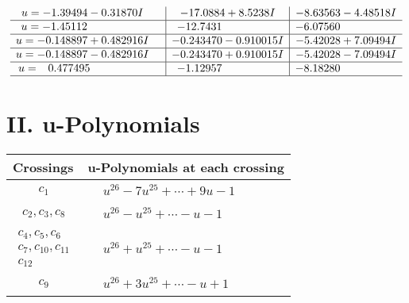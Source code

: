 \documentclass[1p]{elsarticle_modified}
\theoremstyle{definition}
\begin{document}
$$\begin{array}{c|c|c}
\begin{aligned}
u &= -1.39494 - 0.31870 I\end{aligned}
 & -17.0884 + 8.5238 I & -8.63563 - 4.48518 I \\ \hline\begin{aligned}
u &= -1.45112\phantom{ +0.000000I}\end{aligned}
 & -12.7431\phantom{ +0.000000I} & -6.07560\phantom{ +0.000000I} \\ \hline\begin{aligned}
u &= -0.148897 + 0.482916 I\end{aligned}
 & -0.243470 - 0.910015 I & -5.42028 + 7.09494 I \\ \hline\begin{aligned}
u &= -0.148897 - 0.482916 I\end{aligned}
 & -0.243470 + 0.910015 I & -5.42028 - 7.09494 I \\ \hline\begin{aligned}
u &= \phantom{-}0.477495\phantom{ +0.000000I}\end{aligned}
 & -1.12957\phantom{ +0.000000I} & -8.18280\phantom{ +0.000000I}\\
 \hline 
 \end{array}$$\newpage
\newpage\renewcommand{\arraystretch}{1}
\centering \section*{ II. u-Polynomials}
\begin{tabular}{m{50pt}|m{274pt}}
Crossings & \hspace{64pt}u-Polynomials at each crossing \\
\hline $$\begin{aligned}c_{1}\end{aligned}$$&$\begin{aligned}
&u^{26}-7 u^{25}+\cdots+9 u-1
\end{aligned}$\\
\hline $$\begin{aligned}c_{2},c_{3},c_{8}\end{aligned}$$&$\begin{aligned}
&u^{26}- u^{25}+\cdots- u-1
\end{aligned}$\\
\hline $$\begin{aligned}c_{4},c_{5},c_{6}\\c_{7},c_{10},c_{11}\\c_{12}\end{aligned}$$&$\begin{aligned}
&u^{26}+u^{25}+\cdots- u-1
\end{aligned}$\\
\hline $$\begin{aligned}c_{9}\end{aligned}$$&$\begin{aligned}
&u^{26}+3 u^{25}+\cdots- u+1
\end{aligned}$\\
\hline
\end{tabular}\newpage\renewcommand{\arraystretch}{1}
\end{document}

